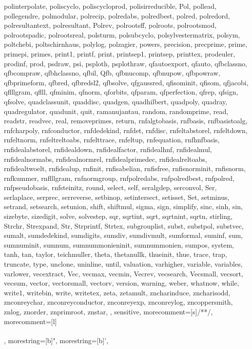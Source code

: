 {{   polinterpolate, poliscyclo, poliscycloprod, polisirreducible, Pol,%
   pollead, pollegendre, polmodular, polrecip, polredabs, polredbest,%
   polred, polredord, polresultantext, polresultant, Polrev, polrootsff,%
   polroots, polrootsmod, polrootspadic, polrootsreal, polsturm, polsubcyclo,%
   polsylvestermatrix, polsym, poltchebi, poltschirnhaus, polylog, polzagier,%
   powers, precision, precprime, prime, primepi, primes, print1, printf,%
   print, printsep1, printsep, printtex, prodeuler, prodinf, prod, psdraw,%
   psi, psploth, psplothraw, qfautoexport, qfauto, qfbclassno, qfbcompraw,%
   qfbhclassno, qfbil, Qfb, qfbnucomp, qfbnupow, qfbpowraw, qfbprimeform,%
   qfbred, qfbredsl2, qfbsolve, qfgaussred, qfisominit, qfisom, qfjacobi,%
   qflllgram, qflll, qfminim, qfnorm, qforbits, qfparam, qfperfection,%
   qfrep, qfsign, qfsolve, quadclassunit, quaddisc, quadgen, quadhilbert,%
   quadpoly, quadray, quadregulator, quadunit, quit, ramanujantau, random,%
   randomprime, read, readstr, readvec, real, removeprimes, return,%
   rnfalgtobasis, rnfbasis, rnfbasistoalg, rnfcharpoly, rnfconductor,%
   rnfdedekind, rnfdet, rnfdisc, rnfeltabstorel, rnfeltdown, rnfeltnorm,%
   rnfeltreltoabs, rnfelttrace, rnfeltup, rnfequation, rnfhnfbasis,%
   rnfidealabstorel, rnfidealdown, rnfidealfactor, rnfidealhnf,%
   rnfidealmul, rnfidealnormabs, rnfidealnormrel, rnfidealprimedec,%
   rnfidealreltoabs, rnfidealtwoelt, rnfidealup, rnfinit, rnfisabelian,%
   rnfisfree, rnfisnorminit, rnfisnorm, rnfkummer, rnflllgram, rnfnormgroup,%
   rnfpolredabs, rnfpolredbest, rnfpolred, rnfpseudobasis, rnfsteinitz,%
   round, select, self, seralgdep, serconvol, Ser, serlaplace, serprec,%
   serreverse, setbinop, setintersect, setisset, Set, setminus, setrand,%
   setsearch, setunion, shift, shiftmul, sigma, sign, simplify, sinc, sinh,%
   sin, sizebyte, sizedigit, solve, solvestep, sqr, sqrtint, sqrt, sqrtnint,%
   sqrtn, stirling, Strchr, Strexpand, Str, Strprintf, Strtex, subgrouplist,%
   subst, substpol, substvec, sumalt, sumdedekind, sumdigits, sumdiv,%
   sumdivmult, sumformal, suminf, sum, sumnuminit, sumnum, sumnummonieninit,%
   sumnummonien, sumpos, system, tanh, tan, taylor, teichmuller, theta,%
   thetanullk, thueinit, thue, trace, trap, truncate, type, unclone,%
   uninline, until, valuation, varhigher, variable, variables, varlower,%
   vecextract, Vec, vecmax, vecmin, Vecrev, vecsearch, Vecsmall, vecsort,%
   vecsum, vector, vectorsmall, vectorv, version, warning, weber, whatnow,%
   while, write1, writebin, write, writetex, zeta, zetamult, zncharinduce,%
   zncharisodd, znconreychar, znconreyconductor, znconreyexp, znconreylog,%
   zncoppersmith, znlog, znorder, znprimroot, znstar,%
   },%
   sensitive,%
   morecomment=[s]{/*}{*/},%
   morecomment=[l]\\\\,%
   morestring=[b]",%
   morestring=[b]',%
  }


